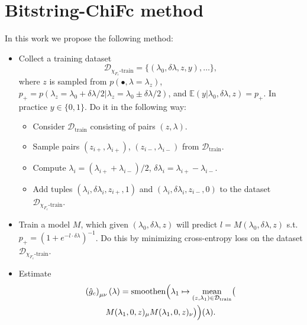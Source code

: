 \documentclass[american,aps,pra,reprint,floatfix,nofootinbib,superscriptaddress]{revtex4-2}
\DeclareMathOperator{\smoothen}{smoothen}
\DeclareMathOperator{\mean}{mean}
\begin{document}
\section{Bitstring-ChiFc method}
In this work we propose the following method:
\begin{itemize}
  \item Collect a training dataset
  \begin{equation}
    \mathcal{D}_{\chi_{F_c}\textrm{-train}} = \{(\lambda_0, \delta \lambda, z, y),\dots\},
  \end{equation}
  where $z$ is sampled from
  $p(\bullet, \lambda=\lambda_{z})$,
  $p_{+} = p(\lambda_{z} = \lambda_0 + \delta \lambda / 2| \lambda_{z} = \lambda_0 \pm \delta \lambda / 2)$, and
    $\mathbb{E}(y|\lambda_0, \delta \lambda, z) = p_{+}$.
    In practice $y \in \{0, 1\}$.
    Do it in the following way:
    \begin{itemize}
      \item Consider $\mathcal{D}_{\textrm{train}}$ consisting of pairs
      $(z, \lambda)$.
      \item Sample pairs $(z_{i{+}}, \lambda_{i{+}})$,
      $(z_{i{-}}, \lambda_{i{-}})$ from $\mathcal{D}_{\textrm{train}}$.
      \item Compute $\lambda_i = (\lambda_{i{+}} + \lambda_{i{-}})/2$,
      $\delta \lambda_i = \lambda_{i{+}} - \lambda_{i{-}}$.
      \item Add tuples $(\lambda_i, \delta \lambda_i, z_{i{+}}, 1)$ and $(\lambda_i, \delta \lambda_i, z_{i{-}}, 0)$ to the dataset $\mathcal{D}_{\chi_{F_c}\textrm{-train}}$.
    \end{itemize}
  \item Train a model $M$, which given $(\lambda_0, \delta \lambda, z)$
  will predict $l = M(\lambda_0, \delta \lambda, z)$
  s.t. $p_{+} = (1+e^{-l \cdot \delta \lambda})^{-1}$.
  Do this by minimizing cross-entropy loss on the dataset
  $\mathcal{D}_{\chi_{F_c}\textrm{-train}}$.
  \item Estimate
  \begin{multline}
  \label{eq:chifc-from-M}
  \left(\hat g_{c}\right)_{\mu\nu}(\lambda) = \smoothen\Bigl(
  \lambda_1 \mapsto \mean_{(z, \lambda_1) \in \mathcal{D}_{\textrm{train}}}
  \bigl(\\
  M(\lambda_1, 0, z)_{\mu}M(\lambda_1, 0, z)_{\nu}\bigr)\Bigr)(\lambda).
  \end{multline}
\end{itemize}
\end{document}
